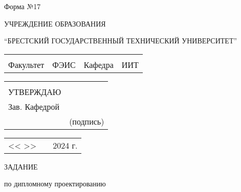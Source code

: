 \documentclass[12pt, А4, twoside]{article}
\begin{document}
 

\begin{FlushRight}{\fontsize{11}{13.75}\selectfont \cyrillicfont
        Форма №17
} \end{FlushRight}

\begin{Center}  {\fontsize{14}{17.5}\selectfont \cyrillicfont 
        УЧРЕЖДЕНИЕ ОБРАЗОВАНИЯ
        \par 
        “БРЕСТСКИЙ ГОСУДАРСТВЕННЫЙ ТЕХНИЧЕСКИЙ УНИВЕРСИТЕТ”
} \end{Center}

\begin{FlushLeft}
\fontsize{12}{15}

    \begin{tabular}{p{1.8cm} p{6.2cm} p{2.0cm} p{6.0cm}} 
        & & & 
        \\ 
        \textsf{Факультет} & 
        \centering \textsf{ФЭИС} \vspace{1pt} \hline &
        \textsf{Кафедра} &
        \centering \textsf{ИИТ} \vspace{1pt} \hline 
    \end{tabular} 

    \begin{tabular}{p{2.5cm} p{5.5cm}} 
        & \\ 
        \textsf{УТВЕРЖДАЮ} & \\
        \textsf{Зав. Кафедрой} & \vspace{1pt} \hline \\ 
        \hspace{2.8cm} &  \centering \textsf{(подпись)} 
    \end{tabular} 

    \begin{tabular}{p{1.0cm} p{5.0cm} p{2.0cm}} 
        \textsf{<< \hspace{4mm} >>} & 
        \vspace{1pt} \hline &
        \textsf{2024 г.} \\
    \end{tabular}

\end{FlushLeft}

\begin{Center} 
    \fontsize{24}{30} \textsf{ЗАДАНИЕ}
    \par 
    \fontsize{14}{17.5} \textrm{по дипломному проектированию}
\end{Center}  
\end{document}
